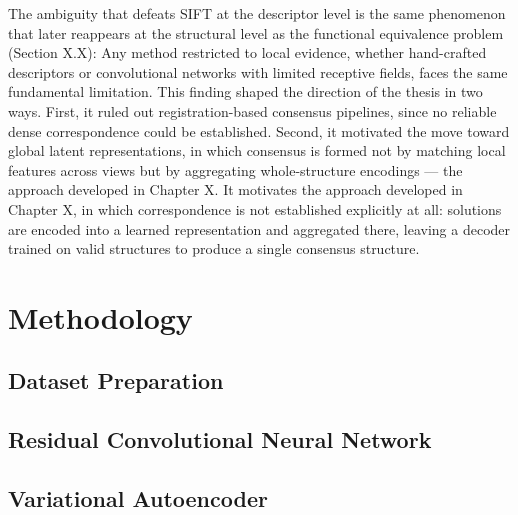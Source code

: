 \documentclass[
  numbers=noenddot,
  english,  %
  a4paper,  %
  twoside,  %
  bibliography=totoc,
  headsepline,
  cleardoublepage=empty,
  parskip=half,
  draft=false
]{scrbook}
\theoremstyle{break}
\begin{document}
The ambiguity that defeats SIFT at the descriptor level is the same phenomenon that later reappears at the structural level as the functional equivalence problem (Section X.X): Any method restricted to local evidence, whether hand-crafted descriptors or convolutional networks with limited receptive fields, faces the same fundamental limitation.
This finding shaped the direction of the thesis in two ways. First, it ruled out registration-based consensus pipelines, since no reliable dense correspondence could be established. Second, it motivated the move toward global latent representations, in which consensus is formed not by matching local features across views but by aggregating whole-structure encodings — the approach developed in Chapter X.
It motivates the approach developed in Chapter X, in which correspondence is not established explicitly at all: solutions are encoded into a learned representation and aggregated there, leaving a decoder trained on valid structures to produce a single consensus structure.


\chapter{Methodology}\label{sec:method}



\section{Dataset Preparation}\label{sec:datasetprep}




\section{Residual Convolutional Neural Network}\label{sec:rcnn}

\section{Variational Autoencoder}\label{sec:rcnn}
\end{document}
